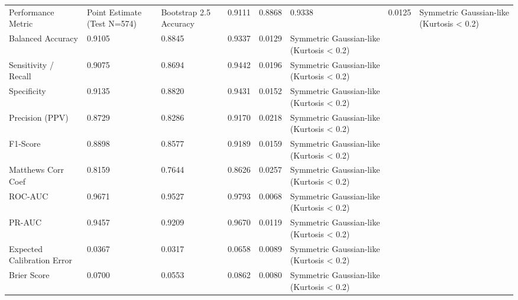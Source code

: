 \begin{tabular}{llllll}
\toprule
Performance Metric & Point Estimate (Test N=574) & Bootstrap 2.5%
\midrule
Accuracy & 0.9111 & 0.8868 & 0.9338 & 0.0125 & Symmetric Gaussian-like (Kurtosis < 0.2) \\
Balanced Accuracy & 0.9105 & 0.8845 & 0.9337 & 0.0129 & Symmetric Gaussian-like (Kurtosis < 0.2) \\
Sensitivity / Recall & 0.9075 & 0.8694 & 0.9442 & 0.0196 & Symmetric Gaussian-like (Kurtosis < 0.2) \\
Specificity & 0.9135 & 0.8820 & 0.9431 & 0.0152 & Symmetric Gaussian-like (Kurtosis < 0.2) \\
Precision (PPV) & 0.8729 & 0.8286 & 0.9170 & 0.0218 & Symmetric Gaussian-like (Kurtosis < 0.2) \\
F1-Score & 0.8898 & 0.8577 & 0.9189 & 0.0159 & Symmetric Gaussian-like (Kurtosis < 0.2) \\
Matthews Corr Coef & 0.8159 & 0.7644 & 0.8626 & 0.0257 & Symmetric Gaussian-like (Kurtosis < 0.2) \\
ROC-AUC & 0.9671 & 0.9527 & 0.9793 & 0.0068 & Symmetric Gaussian-like (Kurtosis < 0.2) \\
PR-AUC & 0.9457 & 0.9209 & 0.9670 & 0.0119 & Symmetric Gaussian-like (Kurtosis < 0.2) \\
Expected Calibration Error & 0.0367 & 0.0317 & 0.0658 & 0.0089 & Symmetric Gaussian-like (Kurtosis < 0.2) \\
Brier Score & 0.0700 & 0.0553 & 0.0862 & 0.0080 & Symmetric Gaussian-like (Kurtosis < 0.2) \\
\bottomrule
\end{tabular}

